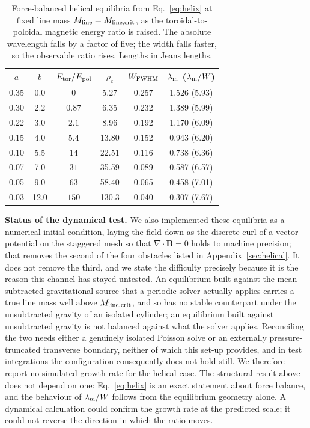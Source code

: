 \documentclass[usenatbib,twoside,twocolumn]{mnras}
\begin{document}
\begin{table}
\caption{Force-balanced helical equilibria from Eq.~\ref{eq:helix} at fixed line mass $M_{\rm line}=M_{\rm line,crit}$, as the toroidal-to-poloidal magnetic energy ratio is raised. The absolute wavelength falls by a factor of five; the width falls faster, so the observable ratio rises. Lengths in Jeans lengths.}
\label{tab:helix}
\footnotesize
\setlength{\tabcolsep}{4pt}
\begin{tabular}{cccccc}
\toprule
$a$ & $b$ & $E_{\rm tor}/E_{\rm pol}$ & $\rho_c$ & $W_{\rm FWHM}$ & $\lambda_{\rm m}$ \; ($\lambda_{\rm m}/W$) \\
\midrule
0.35 & 0.0  & $0$    & 5.27  & 0.257 & 1.526 \; (5.93) \\
0.30 & 2.2  & $0.87$ & 6.35  & 0.232 & 1.389 \; (5.99) \\
0.22 & 3.0  & $2.1$  & 8.96  & 0.192 & 1.170 \; (6.09) \\
0.15 & 4.0  & $5.4$  & 13.80 & 0.152 & 0.943 \; (6.20) \\
0.10 & 5.5  & $14$   & 22.51 & 0.116 & 0.738 \; (6.36) \\
0.07 & 7.0  & $31$   & 35.59 & 0.089 & 0.587 \; (6.57) \\
0.05 & 9.0  & $63$   & 58.40 & 0.065 & 0.458 \; (7.01) \\
0.03 & 12.0 & $150$  & 130.3 & 0.040 & 0.307 \; (7.67) \\
\bottomrule
\end{tabular}
\end{table}

\smallskip\noindent\textbf{Status of the dynamical test.} We also implemented these equilibria as a numerical initial condition, laying the field down as the discrete curl of a vector potential on the staggered mesh so that $\nabla\!\cdot\!\mathbf{B}=0$ holds to machine precision; that removes the second of the four obstacles listed in Appendix~\ref{sec:helical}. It does not remove the third, and we state the difficulty precisely because it is the reason this channel has stayed untested. An equilibrium built against the mean-subtracted gravitational source that a periodic solver actually applies carries a true line mass well above $M_{\rm line,crit}$, and so has no stable counterpart under the unsubtracted gravity of an isolated cylinder; an equilibrium built against unsubtracted gravity is not balanced against what the solver applies. Reconciling the two needs either a genuinely isolated Poisson solve or an externally pressure-truncated transverse boundary, neither of which this set-up provides, and in test integrations the configuration consequently does not hold still. We therefore report no simulated growth rate for the helical case. The structural result above does not depend on one: Eq.~\ref{eq:helix} is an exact statement about force balance, and the behaviour of $\lambda_{\rm m}/W$ follows from the equilibrium geometry alone. A dynamical calculation could confirm the growth rate at the predicted scale; it could not reverse the direction in which the ratio moves.
\end{document}

